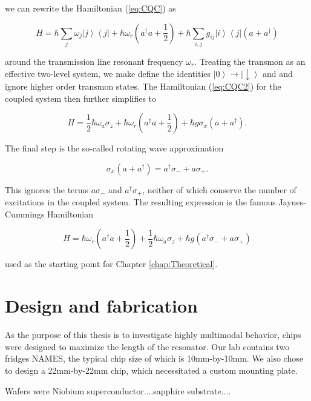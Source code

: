 \documentclass[11 pt, oneside]{book} %
\newcommand{\ket}[1]{\left| #1 \right>} %
\newcommand{\bra}[1]{\left< #1 \right|} %
\begin{document}
we can rewrite the Hamiltonian (\ref{eq:CQC}) as

\begin{equation}\label{eq:CQC2}
H=\hbar\sum_j\omega_j\ket{j}\bra{j}+\hbar\omega_r\left(a^{\dag}a+\frac{1}{2}\right)+\hbar\sum_{i,j}g_{ij}\ket{i}\bra{j}(a+a^{\dag})
\end{equation}

around the transmission line resonant frequency $\omega_r$. Treating the transmon as an effective two-level system, we make define the identities $\ket{0}\rightarrow\ket{\downarrow}$ and and ignore higher order transmon states. The Hamiltonian (\ref{eq:CQC2}) for the coupled system then further simplifies to

\begin{equation}
H=\frac{1}{2}\hbar\omega_a\sigma_z+\hbar\omega_r\left(a^{\dag}a+\frac{1}{2}\right)+\hbar g\sigma_x(a+a^{\dag}).
\end{equation}

The final step is the so-called rotating wave approximation

\begin{equation}
\sigma_x(a+a^{\dag})=a^{\dag}\sigma_- + a\sigma_+.
\end{equation}

This ignores the terms $a\sigma_-$ and $a^{\dag}\sigma_+$, neither of which conserve the number of excitations in the coupled system. The resulting expression is the famous Jaynes-Cummings Hamiltonian 

\begin{equation}
H=\hbar \omega_r\left(a^\dag a + \frac{1}{2}\right) + \frac{1}{2}\hbar \omega_a \sigma_z + \hbar g(a^\dag \sigma_- + a\sigma_+)
\end{equation}

used as the starting point for Chapter \ref{chap:Theoretical}. 

\section{Design and fabrication}
As the purpose of this thesis is to investigate highly multimodal behavior, chips were designed to maximize the length of the resonator. Our lab contains two fridges NAMES, the typical chip size of which is 10mm-by-10mm. We also chose to design a 22mm-by-22mm chip, which necessitated a custom mounting plate. 

Wafers were Niobium superconductor....sapphire substrate....
\end{document}
